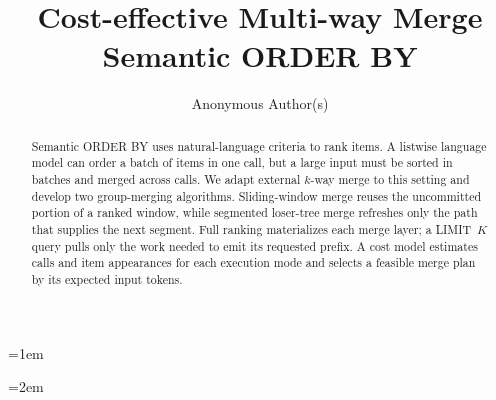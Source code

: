 \documentclass[sigconf,nonacm]{acmart}
\newcommand{\LIMIT}{\textsf{LIMIT}\xspace}
\begin{document}
\title{Cost-effective Multi-way Merge Semantic ORDER BY}
\author{Anonymous Author(s)}
\renewcommand{\shortauthors}{Anonymous}
\begin{abstract}
Semantic \textsf{ORDER BY} uses natural-language criteria to rank items. A listwise language model can order a batch of items in one call, but a large input must be sorted in batches and merged across calls. We adapt external $k$-way merge to this setting and develop two group-merging algorithms. Sliding-window merge reuses the uncommitted portion of a ranked window, while segmented loser-tree merge refreshes only the path that supplies the next segment. Full ranking materializes each merge layer; a \LIMIT~$K$ query pulls only the work needed to emit its requested prefix. A cost model estimates calls and item appearances for each execution mode and selects a feasible merge plan by its expected input tokens.
\end{abstract}
\maketitle
{\emergencystretch=1em\relax\par}
{\emergencystretch=2em\relax\par}


\FloatBarrier



\FloatBarrier


\clearpage
\appendix

\end{document}
